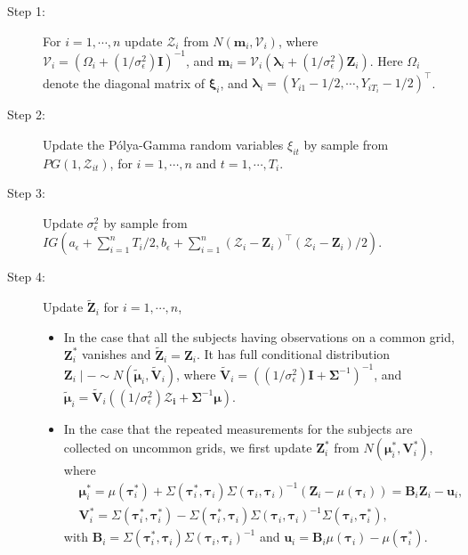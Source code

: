 \begin{description}
   \item[Step 1:] For $i=1,\cdots,n$ update $\boldsymbol{\mathcal{Z}}_i$ from $N(\mathbf{m}_i,\boldsymbol{\mathcal{V}}_i)$, where $\boldsymbol{\mathcal{V}}_i=(\Omega_i+(1/\sigma_{\epsilon}^2)\mathbf{I})^{-1}$, and $\mathbf{m}_i=\boldsymbol{\mathcal{V}}_i(\boldsymbol{\lambda}_i+(1/\sigma_{\epsilon}^2)\mathbf{Z}_i)$. Here $\Omega_i$ denote the diagonal matrix of $\boldsymbol{\xi}_i$, and $\boldsymbol{\lambda}_i=(Y_{i1}-1/2,\cdots,Y_{iT_i}-1/2)^{\top}$.   
   
   \item[Step 2:] Update the Pólya-Gamma random variables $\xi_{it}$ by sample from $PG(1,\mathcal{Z}_{it})$, for $i=1,\cdots,n$ and $t=1,\cdots,T_i$. 
   
   \item[Step 3:]  Update $\sigma_{\epsilon}^2$ by sample from $IG(a_{\epsilon}+\sum_{i=1}^nT_i/2,b_{\epsilon}+\sum_{i=1}^n(\boldsymbol{\mathcal{Z}}_i-\mathbf{Z}_i)^{\top}(\boldsymbol{\mathcal{Z}}_i-\mathbf{Z}_i)/2)$.
   
   \item[Step 4:] Update $\tilde{\mathbf{Z}}_i$ for $i=1,\cdots,n$,
   \begin{itemize}
   	\item In the case that all the subjects having observations on a common grid, $\mathbf{Z}_i^*$ vanishes and $\tilde{\mathbf{Z}}_i=\mathbf{Z}_i$. It has full conditional distribution $\mathbf{Z}_i\mid -\sim N(\tilde{\boldsymbol{\mu}}_i,\tilde{\mathbf{V}}_i)$, where $\tilde{\mathbf{V}}_i=((1/\sigma_{\epsilon}^2)\mathbf{I}+\boldsymbol{\Sigma}^{-1})^{-1}$, and $\tilde{\boldsymbol{\mu}}_i=\tilde{\mathbf{V}}_i((1/\sigma_{\epsilon}^2)\boldsymbol{\mathcal{Z}_i}+\boldsymbol{\Sigma}^{-1}\boldsymbol{\mu})$.
   
   	\item  In the case that the repeated measurements for the subjects are collected on uncommon grids, we first update $\mathbf{Z}_i^*$ from $N(\boldsymbol{\mu}_i^*,\boldsymbol{V}_i^*)$, where
   	\begin{equation*}
\begin{split}
&\boldsymbol{\mu}_i^*=\mu(\boldsymbol{\tau}^*_i)+\Sigma(\boldsymbol{\tau}^*_i,\boldsymbol{\tau}_i)\Sigma(\boldsymbol{\tau}_i,\boldsymbol{\tau}_i)^{-1}(\mathbf{Z}_i-\mu(\boldsymbol{\tau}_i))=\mathbf{B}_i\mathbf{Z}_i-\mathbf{u}_i,\\
&\boldsymbol{V}_i^*=\Sigma(\boldsymbol{\tau}^*_i,\boldsymbol{\tau}^*_i)-\Sigma(\boldsymbol{\tau}^*_i,\boldsymbol{\tau}_i)\Sigma(\boldsymbol{\tau}_i,\boldsymbol{\tau}_i)^{-1}\Sigma(\boldsymbol{\tau}_i,\boldsymbol{\tau}^*_i),
\end{split}
\end{equation*}
with $\mathbf{B}_i=\Sigma(\boldsymbol{\tau}^*_i,\boldsymbol{\tau}_i)\Sigma(\boldsymbol{\tau}_i,\boldsymbol{\tau}_i)^{-1}$ and $\mathbf{u}_i=\mathbf{B}_i\mu(\boldsymbol{\tau}_i)-\mu(\boldsymbol{\tau}^*_i)$.


\end{itemize}
\end{description}
